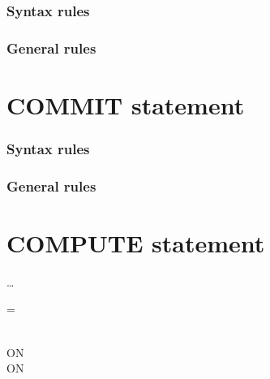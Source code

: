 \subsubsection{Syntax rules}

\subsubsection{General rules}

\section{COMMIT statement}

\begin{syntax}[\miscextcolour]
\end{syntax}

\subsubsection{Syntax rules}

\subsubsection{General rules}

\section{COMPUTE statement}

\begin{syntax}
  \begin{1=}
    \identifier
    \begin{0-1}
    \end{0-1}
  \end{1=} \ldots
  \begin{1=}
    = \\
     \\
  \end{1=}
  \arithmeticexpression

  \begin{0+}
    ON   \imperativestatement \\
     ON   \imperativestatement
  \end{0+}

  \begin{0-1}
  \end{0-1}
\end{syntax}

